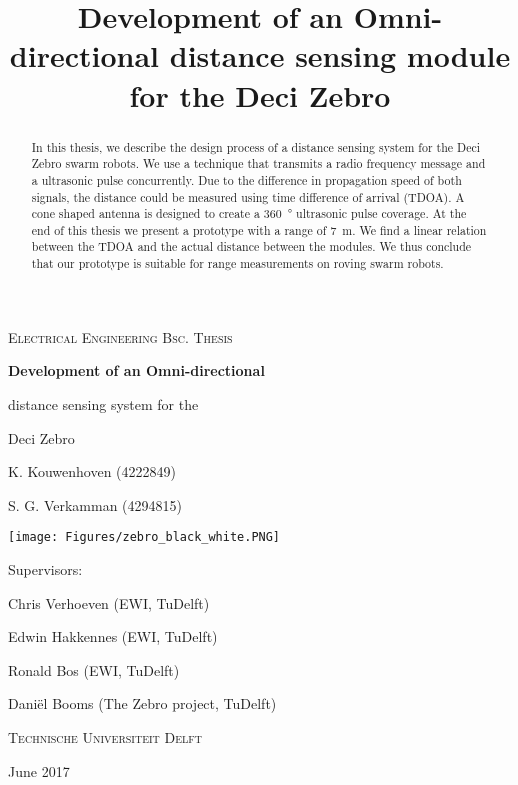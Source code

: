 \documentclass[
11pt, %
english, %
singlespacing, %
headsepline, %
]{MastersDoctoralThesis} %
\title{Development of an Omni-directional distance sensing module for the Deci Zebro}
\begin{document}
\frontmatter %

\pagestyle{plain} %



 \begin{titlepage}

	\vspace{1cm}
	{\scshape\Large Electrical Engineering Bsc. Thesis\par}
	\vspace{1cm}
	{\huge\bfseries Development of an Omni-directional\par distance sensing system for the\par Deci Zebro\par}
	\vspace{1.5cm}
	K. Kouwenhoven (4222849) \par S. G. Verkamman (4294815)\par
	\vspace{1.5cm}
  \texttt{[image: Figures/zebro\_black\_white.PNG]}\par
	\vfill
	{\Large Supervisors:\par}
	Chris Verhoeven (EWI, TuDelft)\par
	Edwin Hakkennes (EWI, TuDelft)\par
	Ronald Bos (EWI, TuDelft)\par
	Daniël Booms (The Zebro project, TuDelft)\par
	\vspace{1cm}
	{\scshape\large Technische Universiteit Delft\par}
	{\large June 2017}
 \end{titlepage}


\begin{abstract}
\addchaptertocentry{\abstractname} %
In this thesis, we describe the design process of a distance sensing system for the Deci Zebro swarm robots.
We use a technique that transmits a radio frequency message and a ultrasonic pulse concurrently.
Due to the difference in propagation speed of both signals, the distance could be measured using time difference of arrival (TDOA).
A cone shaped antenna is designed to create a \SI{360}{\degree} ultrasonic pulse coverage.
At the end of this thesis we present a prototype with a range of \SI{7}{\meter}.
We find a linear relation between the TDOA and the actual distance between the modules.
We thus conclude that our prototype is suitable for range measurements on roving swarm robots.
\end{abstract}
\end{document}
